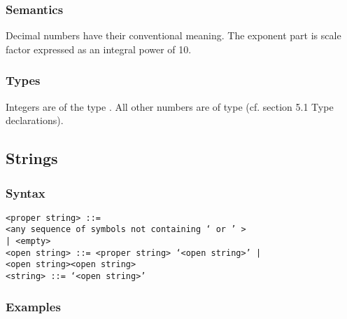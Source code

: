 \documentclass[a4paper,11pt]{article}
\begin{document}
\subsubsection{Semantics}
\label{LblBasicSymbolsNumbersSemantics}

Decimal numbers have their conventional meaning.  The exponent part is
scale factor expressed as an integral power of 10.

\subsubsection{Types}
\label{LblBasicSymbolsNumbersTypes}

Integers are of the type . All other numbers are of type
 (cf. section 5.1 Type declarations).



\subsection{Strings}
\label{LblBasicSymbolsStrings}


\subsubsection{Syntax}
\label{LblBasicSymbolsStringsSyntax}

\begin{flushleft}
\vspace{0.2em}\texttt{<proper string> ::= \\
  \hspace{1.0em}<any sequence of symbols not containing ` or ' >\\
  \hspace{1.0em}| <empty>}\\

\vspace{0.2em}\texttt{<open string> ::= <proper string> `<open string>' |\\
  \hspace{1.0em}<open string><open string>}\\

\vspace{0.2em}\texttt{<string> ::= `<open string>'}\\
\end{flushleft}


\subsubsection{Examples}
\end{document}
